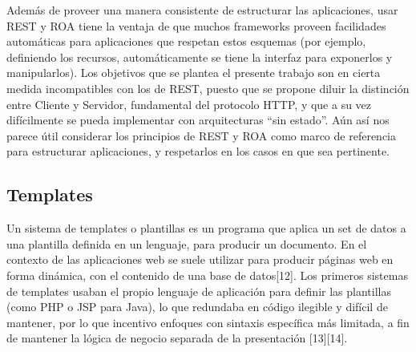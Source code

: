 \documentclass[doc,helv,longtable]{article}
\begin{document}
Además de proveer una manera consistente de estructurar las aplicaciones, usar REST y ROA tiene la ventaja de que muchos frameworks proveen facilidades automáticas para aplicaciones que respetan estos esquemas (por ejemplo, definiendo los recursos, automáticamente se tiene la interfaz para exponerlos y manipularlos). Los objetivos que se plantea el presente trabajo son en cierta medida incompatibles con los de REST, puesto que se propone diluir la distinción entre Cliente y Servidor, fundamental del protocolo HTTP, y que a su vez difícilmente se pueda implementar con arquitecturas “sin estado”. Aún así nos parece útil considerar los principios de REST y ROA como marco de referencia para estructurar aplicaciones, y respetarlos en los casos en que sea pertinente.

\subsection{Templates}
Un sistema de templates o plantillas es un programa que aplica un set de datos a una plantilla definida en un lenguaje, para producir un documento. En el contexto de las aplicaciones web se suele utilizar para producir páginas web en forma dinámica, con el contenido de una base de datos[12]. Los primeros sistemas de templates usaban el propio lenguaje de aplicación para definir las plantillas (como PHP o JSP para Java), lo que redundaba en código ilegible y difícil de mantener, por lo que incentivo enfoques con sintaxis específica más limitada, a fin de mantener la lógica de negocio separada de la presentación [13][14].
\end{document}
